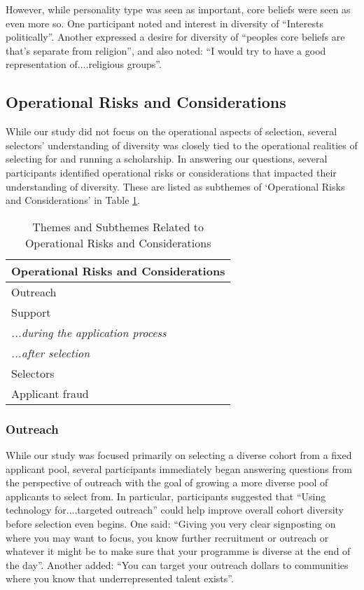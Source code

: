 However, while personality type was seen as important, core beliefs were seen as even more so. One participant noted and interest in diversity of ``Interests politically''. Another expressed a desire for diversity of ``peoples core beliefs are that's separate from religion'', and also noted: ``I would try to have a good representation of....religious groups''.

\subsection{Operational Risks and Considerations}
While our study did not focus on the operational aspects of selection, several selectors' understanding of diversity was closely tied to the operational realities of selecting for and running a scholarship. In answering our questions, several participants identified operational risks or considerations that impacted their understanding of diversity. These are listed as subthemes of `Operational Risks and Considerations' in Table \ref{tab:operational}.

\begin{table}[h]
    \centering
    \caption{Themes and Subthemes Related to Operational Risks and Considerations}
    \label{tab:operational}
    \begin{tabular}{|l|}
        \hline
        \textbf{Operational Risks and Considerations} \\
        \hline
        Outreach \\
        Support \\
        \emph{...during the application process} \\
        \emph{...after selection} \\
        Selectors \\
        Applicant fraud \\
        \hline
    \end{tabular}
\end{table}

\subsubsection{Outreach}
While our study was focused primarily on selecting a diverse cohort from a fixed applicant pool, several participants immediately began answering questions from the perspective of outreach with the goal of growing a more diverse pool of applicants to select from. In particular, participants suggested that ``Using technology for....targeted outreach'' could help improve overall cohort diversity before selection even begins. One said: ``Giving you very clear signposting on where you may want to focus, you know further recruitment or outreach or whatever it might be to make sure that your programme is diverse at the end of the day''. Another added: ``You can target your outreach dollars to communities where you know that underrepresented talent exists''.

